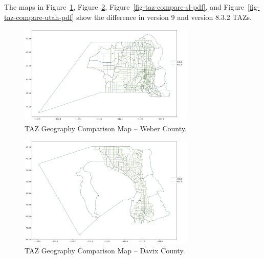 \documentclass[
  letterpaper,
  DIV=11,
  numbers=noendperiod]{scrreprt}
\begin{document}
The maps in Figure~\ref{fig-taz-compare-weber-pdf},
Figure~\ref{fig-taz-compare-davis-pdf},
Figure~\ref{fig-taz-compare-sl-pdf}, and
Figure~\ref{fig-taz-compare-utah-pdf} show the difference in version 9
and version 8.3.2 TAZs.

\begin{figure}[H]

{\centering \includegraphics[width=0.75\textwidth,height=\textheight]{v9x/v900/whats-new/_pictures/pdf-taz-57.png}

}

\caption{\label{fig-taz-compare-weber-pdf}TAZ Geography Comparison Map
-- Weber County.}

\end{figure}

\begin{figure}[H]

{\centering \includegraphics[width=0.75\textwidth,height=\textheight]{v9x/v900/whats-new/_pictures/pdf-taz-11.png}

}

\caption{\label{fig-taz-compare-davis-pdf}TAZ Geography Comparison Map
-- Davix County.}

\end{figure}
\end{document}
